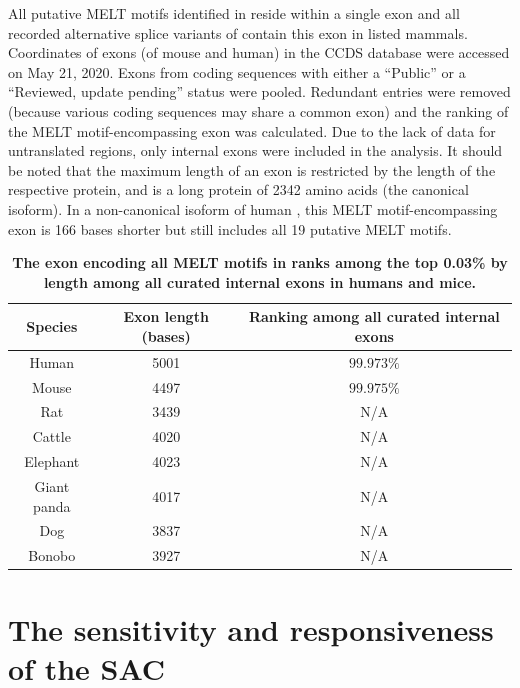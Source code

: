 \begin{table}[H]
    \renewcommand{\arraystretch}{1.5}
    \caption{\textbf{The exon encoding all MELT motifs in  ranks among the top 0.03\% by length among all curated internal exons in humans and mice.}}
    \noindent\justifying All putative MELT motifs identified in \cite{MELTEvolution} reside within a single exon and all recorded alternative splice variants of  contain this exon in listed mammals. Coordinates of exons (of mouse and human) in the CCDS database \cite{CCDS} were accessed on May 21, 2020. Exons from coding sequences with either a ``Public'' or a ``Reviewed, update pending'' status were pooled. Redundant entries were removed (because various coding sequences may share a common exon) and the ranking of the MELT motif-encompassing exon was calculated. Due to the lack of data for untranslated regions, only internal exons were included in the analysis. It should be noted that the maximum length of an exon is restricted by the length of the respective protein, and  is a long protein of \SI{2342}{} amino acids (the canonical isoform). In a non-canonical isoform of human , this MELT motif-encompassing exon is 166 bases shorter but still includes all 19 putative MELT motifs.
    \label{ExonLength}
    \begin{center}
        \begin{tabular}{c c c}
            \hline
            Species & Exon length (bases) & Ranking among all curated internal exons\\
            \hline
            Human & 5001 & $99.973\%$\\
            Mouse & 4497 & $99.975\%$\\
            Rat & 3439 & N/A\\
            Cattle & 4020 & N/A\\
            Elephant & 4023 & N/A\\ %
            Giant panda & 4017 & N/A\\
            Dog & 3837 & N/A\\
            Bonobo & 3927 & N/A\\
            \hline
        \end{tabular}
    \end{center}
\end{table}

\section{The sensitivity and responsiveness of the SAC}

